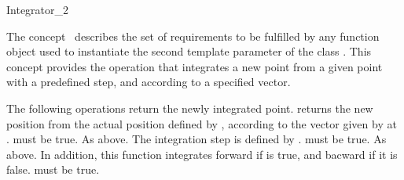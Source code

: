 

\begin{ccRefFunctionObjectConcept}{Integrator_2}


\ccDefinition
  
The concept \ccRefName\ describes the set of requirements to be
fulfilled by any function object used to instantiate the second
template parameter of the class
.  This concept
provides the operation that integrates a new point from a given point
with a predefined step, and according to a specified vector.

\ccTypes
{}
\ccGlue
{}
\ccGlue
{}
\ccGlue
{}
\ccGlue

\ccCreation
{}  %
\ccGlue

\ccOperations
{}
The following operations return the newly integrated point.
{returns the new position from the actual position defined by , according to the vector given by  at .
\ccPrecond {} must be true.}
{As above. The integration step is defined by .
\ccPrecond {} must be true.}
{As above. In addition, this function integrates forward if  is true, and bacward if it is false.
\ccPrecond {} must be true.}

\ccHasModels
{} \\
 \\
\end{ccRefFunctionObjectConcept}



